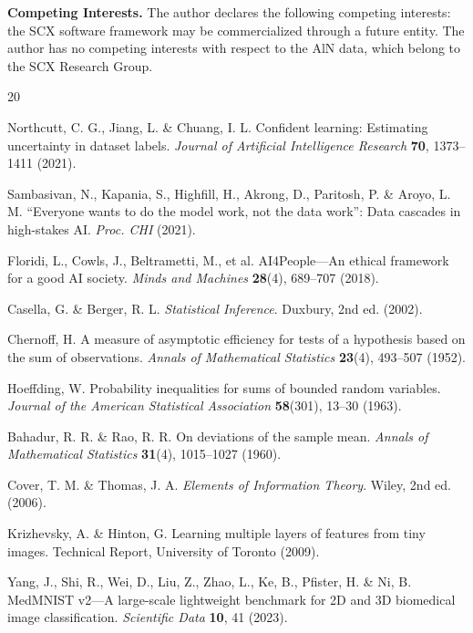 \documentclass[12pt,a4paper]{article}
\begin{document}
\textbf{Competing Interests.}
The author declares the following competing interests: the SCX software framework may be commercialized through a future entity. The author has no competing interests with respect to the AlN data, which belong to the SCX Research Group.


\begin{thebibliography}{20}

 Northcutt, C. G., Jiang, L. \& Chuang, I. L. Confident learning: Estimating uncertainty in dataset labels. \textit{Journal of Artificial Intelligence Research} \textbf{70}, 1373--1411 (2021).

 Sambasivan, N., Kapania, S., Highfill, H., Akrong, D., Paritosh, P. \& Aroyo, L. M. ``Everyone wants to do the model work, not the data work'': Data cascades in high-stakes AI. \textit{Proc. CHI} (2021).

 Floridi, L., Cowls, J., Beltrametti, M., et al. AI4People---An ethical framework for a good AI society. \textit{Minds and Machines} \textbf{28}(4), 689--707 (2018).

 Casella, G. \& Berger, R. L. \textit{Statistical Inference}. Duxbury, 2nd ed. (2002).

 Chernoff, H. A measure of asymptotic efficiency for tests of a hypothesis based on the sum of observations. \textit{Annals of Mathematical Statistics} \textbf{23}(4), 493--507 (1952).

 Hoeffding, W. Probability inequalities for sums of bounded random variables. \textit{Journal of the American Statistical Association} \textbf{58}(301), 13--30 (1963).

 Bahadur, R. R. \& Rao, R. R. On deviations of the sample mean. \textit{Annals of Mathematical Statistics} \textbf{31}(4), 1015--1027 (1960).

 Cover, T. M. \& Thomas, J. A. \textit{Elements of Information Theory}. Wiley, 2nd ed. (2006).

 Krizhevsky, A. \& Hinton, G. Learning multiple layers of features from tiny images. Technical Report, University of Toronto (2009).

 Yang, J., Shi, R., Wei, D., Liu, Z., Zhao, L., Ke, B., Pfister, H. \& Ni, B. MedMNIST v2---A large-scale lightweight benchmark for 2D and 3D biomedical image classification. \textit{Scientific Data} \textbf{10}, 41 (2023).


\end{thebibliography}
\end{document}
